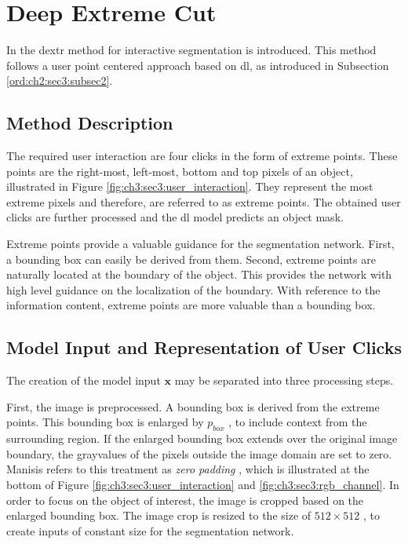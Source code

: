 
\section{Deep Extreme Cut}\label{ord:ch3:sec3}

In \cite{Man18-DEXTR} the \gls{dextr} method for interactive segmentation is introduced.
This method follows a user point centered approach based on \gls{dl}, as introduced in Subsection \ref{ord:ch2:sec3:subsec2}.


\subsection{Method Description}\label{ord:ch3:sec3:subsec1}

The required user interaction are four clicks in the form of extreme points.
These points are the right-most, left-most, bottom and top pixels of an object, illustrated in Figure \ref{fig:ch3:sec3:user_interaction}.
They represent the most extreme pixels and therefore, are referred to as extreme points.
The obtained user clicks are further processed and the \gls{dl} model predicts an object mask.

Extreme points provide a valuable guidance for the segmentation network.
First, a bounding box can easily be derived from them.
Second, extreme points are naturally located at the boundary of the object.
This provides the network with high level guidance on the localization of the boundary.
With reference to the information content, extreme points are more valuable than a bounding box.

\subsection{Model Input and Representation of User Clicks}\label{ord:ch3:sec3:subsec2}

The creation of the model input $\textbf{x}$ may be separated into three processing steps.

First, the image is preprocessed. 
A bounding box is derived from the extreme points. 
This bounding box is enlarged by $p_{{box}}$ , to include context from the surrounding region.
If the enlarged bounding box extends over the original image boundary, the grayvalues of the pixels outside the image domain are set to zero.
Manisis \etal refers to this treatment as \textit{zero padding} \cite{Man18-DEXTR}, which is illustrated at the bottom of Figure \ref{fig:ch3:sec3:user_interaction} and \ref{fig:ch3:sec3:rgb_channel}.
In order to focus on the object of interest, the image is cropped based on the enlarged bounding box.
The image crop is resized to the size of $512 \times 512$ , to create inputs of constant size for the segmentation network.

